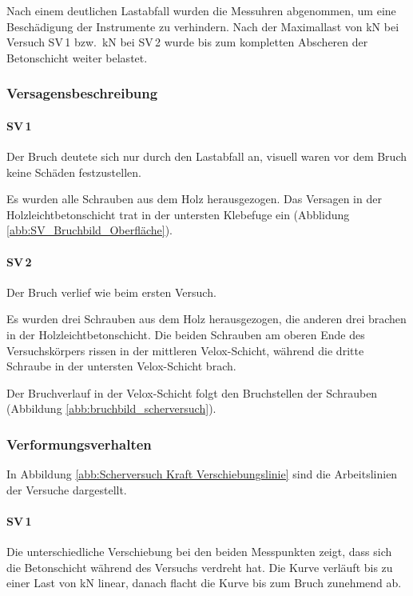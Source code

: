 Nach einem deutlichen Lastabfall wurden die Messuhren abgenommen, um eine Beschädigung der Instrumente zu verhindern.
Nach der Maximallast von \unit[359]{kN} bei Versuch SV\,1 bzw.\ \unit[348]{kN} bei SV\,2 wurde bis zum kompletten Abscheren der Betonschicht weiter belastet.

\subsubsection{Versagensbeschreibung}
\paragraph{SV\,1} 
Der Bruch deutete sich nur durch den Lastabfall an, visuell waren vor dem Bruch keine Schäden festzustellen. 

Es wurden alle Schrauben aus dem Holz herausgezogen. Das Versagen in der Holzleichtbetonschicht trat in der untersten Klebefuge ein (Abblidung \ref{abb:SV_Bruchbild_Oberfläche}). 

\paragraph{SV\,2}
Der Bruch verlief wie beim ersten Versuch.

Es wurden drei Schrauben aus dem Holz herausgezogen, die anderen drei brachen in der Holzleichtbetonschicht. Die beiden Schrauben am oberen Ende des Versuchskörpers rissen in der mittleren Velox-Schicht, während die dritte Schraube in der untersten Velox-Schicht brach.

Der Bruchverlauf in der Velox-Schicht folgt den Bruchstellen der Schrauben (Abbildung \ref{abb:bruchbild_scherversuch}). 

\subsubsection{Verformungsverhalten}
In Abbildung \ref{abb:Scherversuch Kraft Verschiebungslinie} sind die Arbeitslinien der Versuche dargestellt.

\paragraph{SV\,1}
Die unterschiedliche Verschiebung bei den beiden Messpunkten zeigt, dass sich die Betonschicht während des Versuchs verdreht hat.
Die Kurve verläuft bis zu einer Last von \unit[250]{kN} linear, danach flacht die Kurve bis zum Bruch zunehmend ab.

